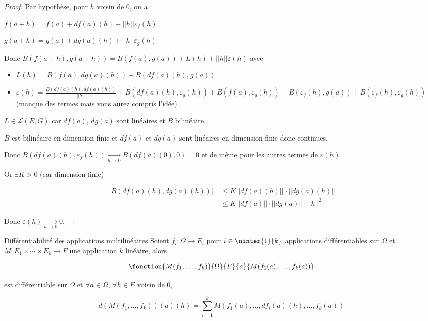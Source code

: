 \begin{proof}
    Par hypothèse, pour $h$ voisin de $0$, on a : 
    
    $f(a + h) = f(a) + df(a)(h) + ||h|| \varepsilon_f(h)$

    $g(a + h) = g(a) + dg(a)(h) + ||h|| \varepsilon_g(h)$

    \svspace

    Donc $B(f(a + h), g(a + h)) = B(f(a), g(a)) + L(h) + ||h|| \varepsilon (h)$ avec

    \begin{itemize}
        \item $L(h) = B(f(a), dg(a)(h)) + B(df(a)(h), g(a))$
        \item $\varepsilon (h) = \frac{B(df(a)(h), df(a)(h))}{||h||} + B(df(a)(h), \varepsilon_g(h)) + B(f(a), \varepsilon_g(h)) + B(\varepsilon_f(h), g(a)) + B(\varepsilon_f(h), \varepsilon_g(h))$ (manque des termes mais vous aurez compris l'idée)
    \end{itemize}

    $L \in \mathscr L(E, G)$ car $df(a)$, $dg(a)$ sont linéaires et $B$ bilinéaire.

    $B$ est bilinéaire en dimension finie et $df(a)$ et $dg(a)$ sont linéaires en dimension finie 
    donc continues. 

    Donc $\displaystyle B(df(a)(h), \varepsilon_f(h)) \xrightarrow[h \to 0 ]{} B(df(a)(0), 0) = 0$ et de même pour les autres termes de $\varepsilon(h)$.

    Or $\exists K > 0$ (car dimension finie) 

    \begin{align}
        ||B(df(a)(h), dg(a)(h))|| & \leqslant K ||df(a)(h)|| \cdot ||dg(a)(h)|| \\
        & \leqslant K ||df(a)|| \cdot ||dg(a)|| \cdot ||h||^2
    \end{align}

    Donc $\varepsilon (h) \xrightarrow[h \to 0 ]{} 0$.
\end{proof}

\begin{proposition}{Différentiabilité des applications multilinéaires}{}
    Soient $f_i : \Omega \to E_i$ pour $i \in \ninter{1}{k}$ applications différentiables sur 
    $\Omega$ et $M : E_1 \times \cdots \times E_k \to F$ une application $k$ linéaire, alors 
    
    $$\fonction{M(f_1, \ldots, f_k)}{\Omega}{F}{a}{M(f_1(a), \ldots, f_k(a))}$$
    
    est différentiable sur $\Omega$ et
    $\forall a \in \Omega$, $\forall h \in E$ voisin de $0$, 

    $$d(M(f_1, \ldots, f_k))(a)(h) = \sum_{i = 1 }^{k } M(f_1(a), \ldots, df_i(a)(h), \ldots, f_k(a))$$
\end{proposition}

